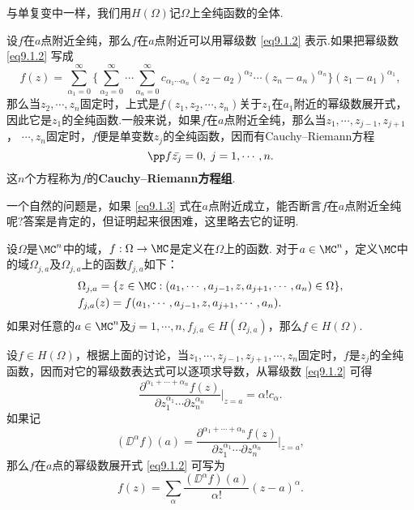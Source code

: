 与单复变中一样，我们用$H(\Omega)$记$\Omega$上全纯函数的全体.

设$f$在$a$点附近全纯，那么$f$在$a$点附近可以用幂级数 \eqref{eq9.1.2} 表示.如果把幂级数 \eqref{eq9.1.2} 写成
\[f(z)=\sum_{\alpha_1=0}^\infty\bigg\{\sum_{\alpha_2=0}^\infty\cdots
\sum_{\alpha_n=0}^\infty c_{\alpha_1\cdots\alpha_n}(z_2-a_2)^{\alpha_2}\cdots(z_n-a_n)^{\alpha_n}\bigg\}
(z_1-a_1)^{\alpha_1},\]
那么当$z_2,\cdots,z_n$固定时，上式是$f(z_1,z_2,\cdots,z_n)$关于$z_1$在$a_1$附近的幂级数展开式，因此它是$z_1$的全纯函数.一般来说，如果$f$在$a$点附近全纯，那么当$z_1,\cdots,z_{j-1},z_{j+1}$， $\cdots,z_n$固定时，$f$便是单变数$z_j$的全纯函数，因而有Cauchy--Riemann方程
\begin{equation}\label{eq9.1.3}
\pp f{\bar{z_j}}=0,\;j=1,\cdots,n.
\end{equation}
这$n$个方程称为$f$的\textbf{Cauchy--Riemann方程组}.

一个自然的问题是，如果 \eqref{eq9.1.3} 式在$a$点附近成立，能否断言$f$在$a$点附近全纯呢?答案是肯定的，但证明起来很困难，这里略去它的证明.
\begin{theorem}\label{thm9.1.3}
设$\Omega$是$\MC^n$中的域，$f:\Omega\to\MC$是定义在$\Omega$上的函数. 对于$a\in\MC^n$，定义$\MC$中的域$\Omega_{j,a}$及$\Omega_{j,a}$上的函数$f_{j,a}$如下：
\begin{align*}
&\Omega_{j,a}=\{z\in\MC:(a_1,\cdots,a_{j-1},z,a_{j+1},\cdots,a_n)\in\Omega\},\\
&f_{j,a}(z)=f(a_1,\cdots,a_{j-1},z,a_{j+1},\cdots,a_n).
\end{align*}
如果对任意的$a\in\MC^n$及$j=1,\cdots,n,f_{j,a}\in H(\Omega_{j,a})$，那么$f\in H(\Omega)$.
\end{theorem}

设$f\in H(\Omega)$，根据上面的讨论，当$z_1,\cdots,z_{j-1},z_{j+1},\cdots,z_n$固定时，$f$是$z_j$的全纯函数，因而对它的幂级数表达式可以逐项求导数，从幂级数 \eqref{eq9.1.2} 可得
\[\frac{\partial^{\alpha_1+\cdots+\alpha_n}f(z)}{\partial z_1^{\alpha_1}
\cdots\partial z_n^{\alpha_n}}\bigg|_{z=a}=\alpha!c_\alpha.\]
如果记
\[(\DD^\alpha f)(a)=\frac{\partial^{\alpha_1+\cdots+\alpha_n}f(z)}{\partial z_1^{\alpha_1}
\cdots\partial z_n^{\alpha_n}}\bigg|_{z=a},\]
那么$f$在$a$点的幂级数展开式 \eqref{eq9.1.2} 可写为
\[f(z)=\sum_\alpha\frac{(\DD^\alpha f)(a)}{\alpha!}(z-a)^\alpha.\]

